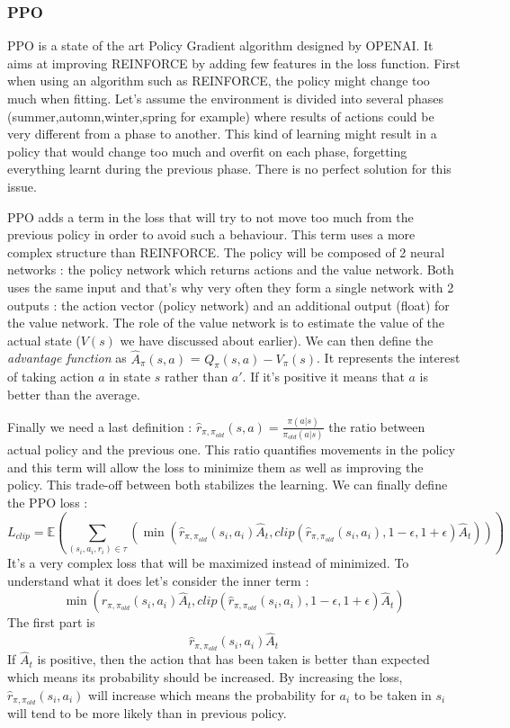 \documentclass[11pt]{article}
\begin{document}
\subsubsection{PPO}
PPO is a state of the art Policy Gradient algorithm designed by OPENAI. It aims at improving REINFORCE by adding few features in the loss function. First when using an algorithm such as REINFORCE, the policy might change too much when fitting. Let's assume the environment is divided into several phases (summer,automn,winter,spring for example) where results of actions could be very different from a phase to another. This kind of learning might result in a policy that would change too much and overfit on each phase, forgetting everything learnt during the previous phase. There is no perfect solution for this issue.

PPO adds a term in the loss that will try to not move too much from the previous policy in order to avoid such a behaviour. This term uses a more complex structure than REINFORCE. The policy will be composed of 2 neural networks : the policy network which returns actions and the value network. Both uses the same input and that's why very often they form a single network with 2 outputs : the action vector (policy network) and an additional output (float) for the value network. The role of the value network is to estimate the value of the actual state ($V(s)$ we have discussed about earlier). We can then define the \emph{advantage function} as $\hat A_{\pi}(s,a)$ = $Q_\pi(s,a)-V_\pi(s)$. It represents the interest of taking action $a$ in state $s$ rather than $a'$. If it's positive it means that $a$ is better than the average.

Finally we need a last definition : $\hat r_{\pi,\pi_{old}}(s,a) = \frac{\pi(a|s)}{\pi_{old}(a|s)}$ the ratio between actual policy and the previous one. This ratio quantifies movements in the policy and this term will allow the loss to minimize them as well as improving the policy. This trade-off between both stabilizes the learning. We can finally define the PPO loss :
$$L_{clip} = \mathbb{E}(\sum_{(s_i,a_i,r_i)\in\tau}(\min(\hat r_{\pi,\pi_{old}}(s_i,a_i)\hat A_t,clip(\hat r_{\pi,\pi_{old}}(s_i,a_i),1-\epsilon,1+\epsilon)\hat A_t)))$$
It's a very complex loss that will be maximized instead of minimized. To understand what it does let's consider the inner term :
$$\min(\hat r_{\pi,\pi_{old}}(s_i,a_i)\hat A_t,clip(\hat r_{\pi,\pi_{old}}(s_i,a_i),1-\epsilon,1+\epsilon)\hat A_t)$$
The first part is 
$$\hat r_{\pi,\pi_{old}}(s_i,a_i)\hat A_t$$
If $\hat A_t$ is positive, then the action that has been taken is better than expected which means its probability should be increased. By increasing the loss, $\hat r_{\pi,\pi_{old}}(s_i,a_i)$ will increase which means the probability for $a_i$ to be taken in $s_i$ will tend to be more likely than in previous policy.
\end{document}
